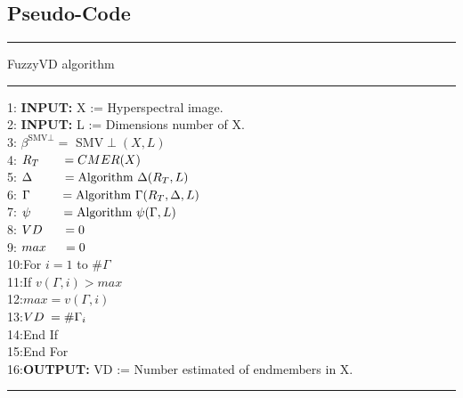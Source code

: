 \documentclass[11pt, oneside]{Thesis} %
\begin{document}
\newpage
\subsection{Pseudo-Code}

\noindent\rule[0.1cm]{\linewidth}{0.3pt}
\begin{center}
  \vspace{-1cm}
  FuzzyVD algorithm
  \vspace{-1cm}
\end{center}
\noindent\rule[0.1cm]{\linewidth}{0.3pt}
1: \hspace{0.3cm}\textbf{INPUT:} X := Hyperspectral image. \\ 
2: \hspace{0.3cm}\textbf{INPUT:} L := Dimensions number of X. \\
3: \hspace{0.8cm}$\beta^{\text{SMV}\perp} = $ SMV$\perp(X,L)$ \\
4: \hspace{0.8cm}$R_T \hspace{0.62cm} = CMER(X)$ \\
5: \hspace{0.8cm}$\Delta \hspace{0.83cm} = \text{Algorithm } \Delta (R_T,L)$\\
6: \hspace{0.85cm}$\Gamma \hspace{0.83cm} = \text{Algorithm } \Gamma (R_T,\Delta,L)$\\
7: \hspace{0.83cm}$\psi \hspace{0.83cm} = \text{Algorithm } \psi (\Gamma,L)$\\
8: \hspace{0.8cm}$VD \hspace{0.55cm} = 0$\\
9: \hspace{0.8cm}$max \hspace{0.46cm} = 0$\\
10:\hspace{0.8cm}For $i=1$ to $\#\Gamma$\\
11:\hspace{1.2cm}If $v(\Gamma,i) > max$\\
12:\hspace{1.6cm}$max = v(\Gamma,i)$\\
13:\hspace{1.6cm}$VD \hspace{0.09cm} = \#\Gamma_i$\\
14:\hspace{1.2cm}End If\\
15:\hspace{0.8cm}End For\\
16:\hspace{0.25cm}\textbf{OUTPUT:} VD := Number estimated of endmembers in X.\\
\noindent\rule[0.1cm]{\linewidth}{0.3pt}
\end{document}
